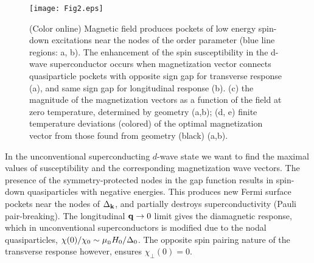 \documentclass[aps,prl,twocolumn,showpacs,amsmath,amssymb]{revtex4-1}
\begin{document}
%
\begin{figure}[t]
\texttt{[image: Fig2.eps]}
\caption{ 
	\label{fig:qq} 
	(Color online) 
	Magnetic field produces pockets of low energy spin-down excitations near the nodes 
	of the order parameter (blue line regions: a, b). 
	The enhancement of the spin susceptibility in the d-wave superconductor occurs 
	when magnetization vector connects quasiparticle pockets with opposite sign gap 
	for transverse response (a), and same sign gap for longitudinal response (b). 
	(c) the magnitude of the magnetization vectors as a function of the field at zero 
	temperature, determined by geometry (a,b); 
	(d, e) finite temperature deviations (colored) of the optimal magnetization vector from those found from geometry (black) (a,b). 
} 
\end{figure}

In the unconventional superconducting $d$-wave state we want to find the
maximal values of susceptibility and the corresponding 
magnetization wave vectors. 
The presence of the symmetry-protected nodes in the gap function results in 
spin-down quasiparticles with negative energies. This produces new Fermi surface pockets near the nodes 
of $\Delta_{\bf k}$,\cite{kato11_sc_afm} and partially destroys superconductivity (Pauli pair-breaking). 
The longitudinal ${\bf q} \to 0$ limit gives the diamagnetic response, which in unconventional superconductors 
is modified due to the nodal quasiparticles, $\chi(0)/\chi_0 \sim \mu_{\mbox{\tiny B}} H_0/\Delta_0$. The opposite spin pairing nature of the 
transverse response however, ensures $\chi_\perp (0) = 0$.  
 
\end{document}
